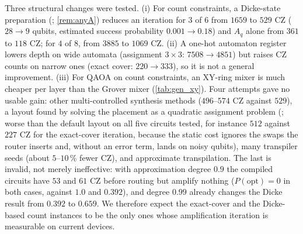 Three structural changes were tested. (i) For count constraints, a Dicke-state preparation (; \cref{rem:anyA}) reduces an iteration for $3$ of $6$ from $1659$ to $529$ CZ ($28\to9$ qubits, estimated success probability $0.001\to0.18$) and $A_q$ alone from $361$ to $118$ CZ; for $4$ of $8$, from $3885$ to $1069$ CZ. (ii) A one-hot automaton register lowers depth on wide automata (assignment $3\times3$: $7508\to4851$) but raises CZ counts on narrow ones (exact cover: $220\to333$), so it is not a general improvement. (iii) For QAOA on count constraints, an XY-ring mixer is much cheaper per layer than the Grover mixer (\cref{tab:gen_xy}). Four attempts gave no usable gain: other multi-controlled synthesis methods ($496$--$574$ CZ against $529$), a layout found by solving the placement as a quadratic assignment problem (; worse than the default layout on all five circuits tested, for instance $512$ against $227$ CZ for the exact-cover iteration, because the static cost ignores the swaps the router inserts and, without an error term, lands on noisy qubits), many transpiler seeds (about $5$--$10$\,\% fewer CZ), and approximate transpilation. The last is invalid, not merely ineffective: with approximation degree $0.9$ the compiled circuits have $53$ and $61$ CZ before routing but amplify nothing ($P(\mathrm{opt})=0$ in both cases, against $1.0$ and $0.392$), and degree $0.99$ already changes the Dicke result from $0.392$ to $0.659$. We therefore expect the exact-cover and the Dicke-based count instances to be the only ones whose amplification iteration is measurable on current devices.

